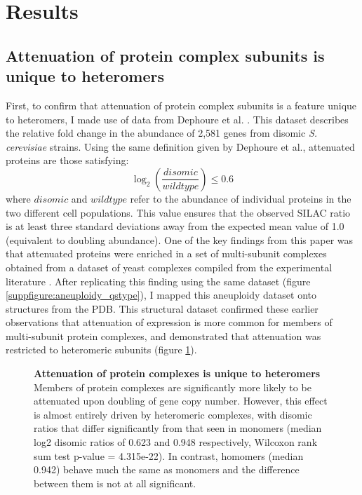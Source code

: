 \documentclass[a4paper,11pt,twoside,openright]{scrbook}
\begin{document}
\clearpage

\section{Results}
\subsection{Attenuation of protein complex subunits is unique to heteromers}
First, to confirm that attenuation of protein complex subunits is a feature
unique to heteromers, I made use of data from Dephoure et al.
\cite{Dephoure2014}. This dataset describes the relative fold change in the
abundance of 2,581 genes from disomic \textit{S. cerevisiae} strains. Using the
same definition given by Dephoure et al., attenuated proteins are those
satisfying:
\begin{displaymath}
    \log_{2} \left( \frac{disomic}{wildtype} \right) \leq 0.6
\end{displaymath}
where $disomic$ and $wildtype$ refer to the abundance of individual proteins in
the two different cell populations. This value ensures that the observed SILAC
ratio is at least three standard deviations away from the expected mean value of
1.0 (equivalent to doubling abundance). One of the key findings from this paper
was that attenuated proteins were enriched in a set of multi-subunit complexes
obtained from a dataset of yeast complexes compiled from the experimental
literature \cite{Pu2009}. After replicating this finding using the same dataset
(figure \ref{suppfigure:aneuploidy_qstype}), I mapped this aneuploidy dataset
onto structures from the PDB. This structural dataset confirmed these earlier
observations that attenuation of expression is more common for members of
multi-subunit protein complexes, and demonstrated that attenuation was
restricted to heteromeric subunits (figure \ref{figure:aneuploidy_qstype}).

\begin{figure}[h]
    \caption[Attenuation of protein complexes is unique to heteromers]{\sffamily
    \textbf{Attenuation of protein complexes is unique to heteromers} \\ \small
    Members of protein complexes are significantly more likely to be attenuated
    upon doubling of gene copy number. However, this effect is almost entirely
    driven by heteromeric complexes, with disomic ratios that differ
    significantly from that seen in monomers (median log2 disomic ratios of
    0.623 and 0.948 respectively, Wilcoxon rank sum test p-value = 4.315e-22).
    In contrast, homomers (median 0.942) behave much the same as monomers and
    the difference between them is not at all significant.}
    \label{figure:aneuploidy_qstype}
\end{figure}
\end{document}
